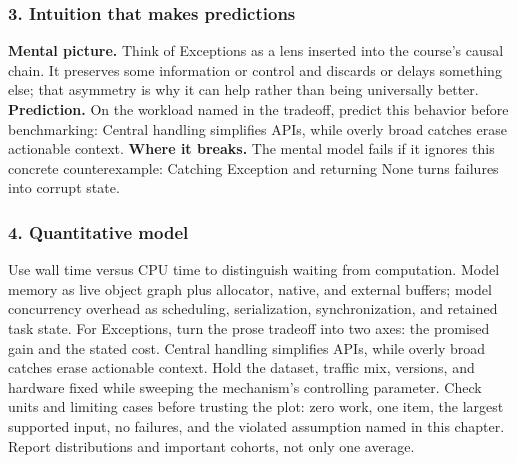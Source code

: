 \subsubsection*{3. Intuition that makes predictions}
\textbf{Mental picture.} Think of Exceptions as a lens inserted into the course's causal chain. It preserves some information or control and discards or delays something else; that asymmetry is why it can help rather than being universally better.
\textbf{Prediction.} On the workload named in the tradeoff, predict this behavior before benchmarking: Central handling simplifies APIs, while overly broad catches erase actionable context.
\textbf{Where it breaks.} The mental model fails if it ignores this concrete counterexample: Catching Exception and returning None turns failures into corrupt state.
\subsubsection*{4. Quantitative model}
Use wall time versus CPU time to distinguish waiting from computation. Model memory as live object graph plus allocator, native, and external buffers; model concurrency overhead as scheduling, serialization, synchronization, and retained task state.
For Exceptions, turn the prose tradeoff into two axes: the promised gain and the stated cost. Central handling simplifies APIs, while overly broad catches erase actionable context. Hold the dataset, traffic mix, versions, and hardware fixed while sweeping the mechanism's controlling parameter.
Check units and limiting cases before trusting the plot: zero work, one item, the largest supported input, no failures, and the violated assumption named in this chapter. Report distributions and important cohorts, not only one average.
